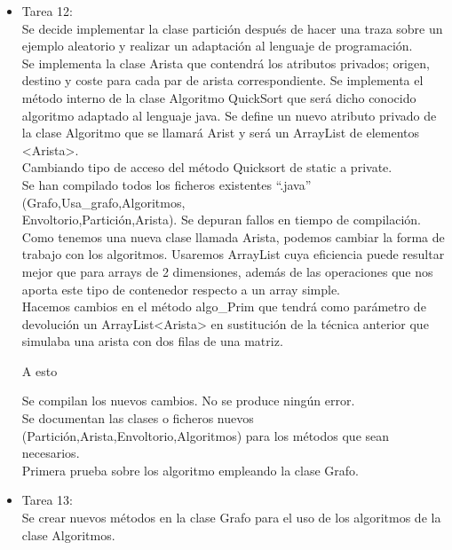 \begin{itemize}
\item Tarea 12:\\
Se decide implementar la clase partición después de hacer una traza sobre un ejemplo aleatorio y realizar un adaptación al lenguaje de programación.\\

Se implementa la clase Arista que contendrá los atributos privados; origen, destino y coste para cada par de arista correspondiente. Se implementa el método interno de la clase Algoritmo QuickSort que será dicho conocido algoritmo adaptado al lenguaje java. Se define un nuevo atributo privado de la clase Algoritmo que se llamará Arist y será un ArrayList de elementos <Arista>.\\

Cambiando tipo de acceso del método Quicksort de static a private.\\

Se han compilado todos los ficheros existentes ``.java'' (Grafo,Usa\_grafo,Algoritmos,\\Envoltorio,Partición,Arista). 
Se depuran fallos en tiempo de compilación.\\

Como tenemos una nueva clase llamada Arista, podemos cambiar la forma de trabajo con los algoritmos. Usaremos ArrayList cuya eficiencia puede resultar mejor que para arrays de 2 dimensiones, además de las operaciones que nos aporta este tipo de contenedor respecto a un array simple.\\

Hacemos cambios en el método algo\_Prim que tendrá como parámetro de devolución un ArrayList<Arista> en sustitución de la técnica anterior que simulaba una arista con dos filas de una matriz.



A esto



Se compilan los nuevos cambios. No se produce ningún error.\\

Se documentan las clases o ficheros nuevos (Partición,Arista,Envoltorio,Algoritmos) para los métodos que sean necesarios.\\

Primera prueba sobre los algoritmo empleando la clase Grafo.\\

\item Tarea 13:\\
Se crear nuevos métodos en la clase Grafo para el uso de los algoritmos de la clase Algoritmos.\\


\end{itemize}
